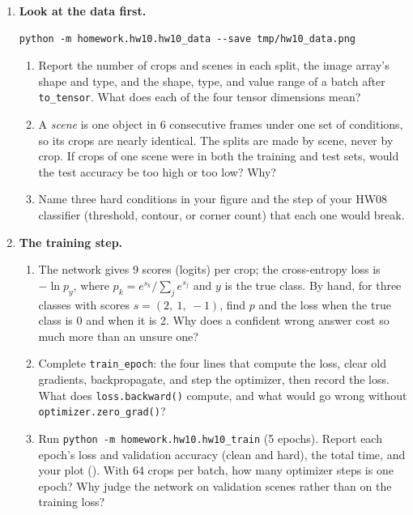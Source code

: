 \begin{enumerate}
\item \textbf{Look at the data first.}
\begin{lstlisting}
python -m homework.hw10.hw10_data --save tmp/hw10_data.png
\end{lstlisting}
\begin{enumerate}
\item Report the number of crops and scenes in each split, the image
array's shape and type, and the shape, type, and value range of a batch
after \texttt{to\_tensor}. What does each of the four tensor dimensions mean?
\item A \emph{scene} is one object in 6 consecutive frames under one set of
conditions, so its crops are nearly identical. The splits are made by scene,
never by crop. If crops of one scene were in both the training and test
sets, would the test accuracy be too high or too low? Why?
\item Name three hard conditions in your figure and the step of your HW08
classifier (threshold, contour, or corner count) that each one would break.
\end{enumerate}

\item \textbf{The training step.}
\begin{enumerate}
\item The network gives 9 scores (logits) per crop; the cross-entropy loss is
$-\ln p_y$, where $p_k=e^{s_k}/\sum_j e^{s_j}$ and $y$ is the true class. By
hand, for three classes with scores $s=(2,\ 1,\ -1)$, find $p$ and the loss
when the true class is 0 and when it is 2. Why does a confident wrong answer
cost so much more than an unsure one?
\item Complete \texttt{train\_epoch}: the four lines that compute the loss,
clear old gradients, backpropagate, and step the optimizer, then record the
loss. What does \texttt{loss.backward()} compute, and what would go wrong
without \texttt{optimizer.zero\_grad()}?
\item Run \texttt{python -m homework.hw10.hw10\_train} (5 epochs). Report each
epoch's loss and validation accuracy (clean and hard), the total time, and
your plot (). With 64 crops per batch, how many
optimizer steps is one epoch? Why judge the network on validation scenes
rather than on the training loss?
\end{enumerate}


\end{enumerate}
